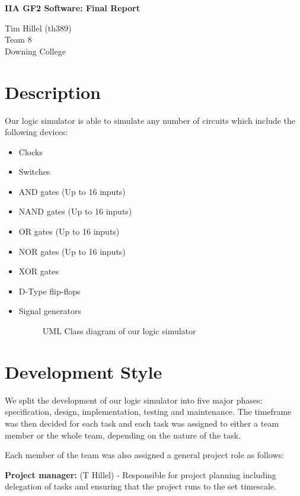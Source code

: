 \documentclass[a4paper,10pt]{article}
\begin{document}
\begin{center}
\LARGE \textbf{IIA GF2 Software: Final Report}

\small Tim Hillel (th389) \\ Team 8 \\ Downing College
\end{center}

\tableofcontents
\pagebreak

\section{Description}
Our logic simulator is able to simulate any number of circuits which include the following devices:

\begin{itemize}
\item Clocks
\item Switches
\item AND gates (Up to 16 inputs)
\item NAND gates (Up to 16 inputs)
\item OR gates (Up to 16 inputs)
\item NOR gates (Up to 16 inputs)
\item XOR gates
\item D-Type flip-flops
\item Signal generators

\begin{figure}[h]
 \centering
 \caption{UML Class diagram of our logic simulator}
 \label{fig:uml}
\end{figure}


\end{itemize}
\section{Development Style}

We split the development of our logic simulator into five major phases: specification, design, implementation, testing and maintenance. The timeframe was then decided for each task and each task was assigned to either a team member or the whole team, depending on the nature of the task.

Each member of the team was also assigned a general project role as follows:

\textbf{Project manager:} (T Hillel) - Responsible for project planning including delegation of tasks and ensuring that the project runs to the set timescale.
\end{document}
